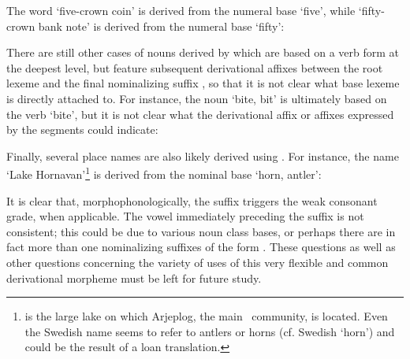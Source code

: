 The word  ‘five-crown coin’ is derived from the numeral base  ‘five’, while  ‘fifty-crown bank note’ is derived from the numeral base  ‘fifty’: %
\ea\label{NMLZ2ex6}
\z
\ea\label{NMLZ2ex7}
\z

There are still other cases of nouns derived by  which are based on a verb form at the deepest level, but feature subsequent derivational affixes between the root lexeme and the final nominalizing suffix , so that it is not clear what base lexeme  is directly attached to. For instance, the noun  ‘bite, bit’ is ultimately based on the verb  ‘bite’, but it is not clear what the derivational affix or affixes expressed by the segments  could indicate: %
\ea\label{NMLZ2ex8}
\z

Finally, several place names are also likely derived using . For instance, the name  ‘Lake Hornavan’\footnote{ is the large lake on which Arjeplog, the main \PS\ community, is located. Even the Swedish name  seems to refer to antlers or horns (cf. Swedish  ‘horn’) and could be the result of a loan translation.} 
is derived from the nominal base  ‘horn, antler’: %
\ea\label{NMLZ2ex9}
\z

It is clear that, morphophonologically, the suffix  triggers the weak consonant grade, when applicable. The vowel immediately preceding the suffix  is not consistent; this could be due to various noun class bases, or perhaps there are in fact more than one nominalizing suffixes of the form . These questions as well as other questions concerning the variety of uses of this very flexible and common derivational morpheme must be left for future study. 



